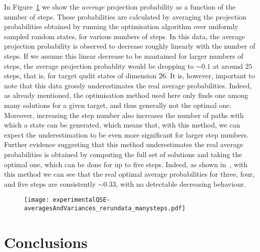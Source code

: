 In Figure~\ref{fig:avgProbabilitiesVsStepNumber} we show the \textit{average} projection probability as a function of the number of steps. These probabilities are calculated by averaging the projection probabilities obtained by running the optimisation algorithm over uniformly sampled random states, for various numbers of steps. In this data, the average projection probability is observed to decrease roughly linearly with the number of steps. If we assume this linear decrease to be mantained for larger numbers of steps, the average projection probablity would be dropping to $\sim 0.1$ at around $25$ steps, that is, for target qudit states of dimension $26$.
It is, however, important to note that this data grossly underestimates the real average probabilities. Indeed, as already mentioned, the optimisation method used here only finds one among many solutions for a given target, and thus generally not the optimal one. Moreover, increasing the step number also increases the number of paths with which a state can be generated, which means that, with this method, we can expect the underestimation to be even more significant for larger step numbers.
Further evidence suggesting that this method underestimates the real average probabilities is obtained by computing the full set of solutions and taking the optimal one, which can be done for up to five steps. Indeed, as shown in~\cite{innocenti2017quantum}, with this method we can see that the real optimal average probabilities for three, four, and five steps are consistently $\sim 0.33$, with no detectable decreasing behaviour.
\begin{figure}[ht!]
    \centering
    \texttt{[image: experimentalQSE-averagesAndVariances\_rerundata\_manysteps.pdf]}
    \caption{}
    \label{fig:avgProbabilitiesVsStepNumber}
\end{figure}

\section{Conclusions}
\label{sec:expQWs:conclusions}

